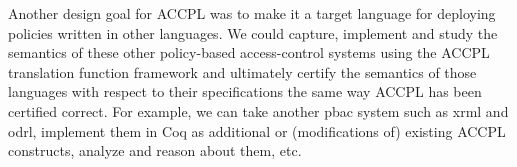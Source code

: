 \documentclass[runningheads,a4paper]{llncs}
\begin{document}
Another design goal for \ac{ACCPL} was to make it a target language for deploying policies written in other languages. We could capture, implement and study the semantics of these other policy-based access-control systems using the \ac{ACCPL} translation function framework and ultimately certify the semantics of those languages with respect to their specifications the same way \ac{ACCPL} has been certified correct. For example, we can take another \ac{pbac} system such as \ac{xrml} and \ac{odrl}, implement them in Coq as additional or (modifications of) existing \ac{ACCPL} constructs, analyze and reason about them, etc. 






\end{document}
